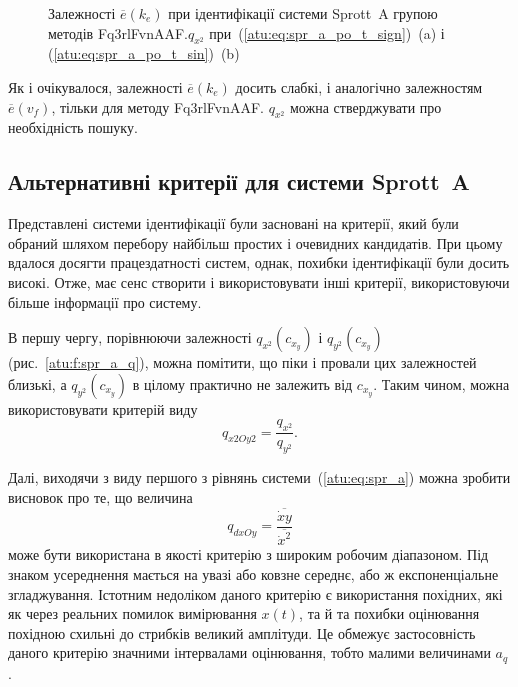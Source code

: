 \begin{figure}[htb!]
  \caption{Залежності $\overline{e} (k_e)$ при ідентифікації системи Sprott~A групою методів Fq3rlFvnAAF.$q_{x^2}$ при~(\ref{atu:eq:spr_a_po_t_sign})~(a) і (\ref{atu:eq:spr_a_po_t_sin})~(b)}
  \label{atu:f:spr_a_k_e_Fq3rlFvnAAF_q_x2}
\end{figure}

Як і очікувалося, залежності
$\overline{e}(k_e)$ досить слабкі, і аналогічно залежностям
$\overline{e}(v_f)$, тільки для методу Fq3rlFvnAAF.
$q_{x^2}$ можна стверджувати про необхідність пошуку.


\subsection{Альтернативні критерії для системи Sprott~A} %

Представлені системи ідентифікації були засновані на критерії,
який були обраний шляхом перебору найбільш простих і очевидних
кандидатів. При цьому вдалося досягти працездатності систем,
однак, похибки ідентифікації були досить високі. Отже, має
сенс створити і використовувати інші критерії, використовуючи
більше інформації про систему.

В першу чергу, порівнюючи залежності
$q_{x^2}(c_{x_y})$ і
$q_{y^2}(c_{x_y})$ (рис.~\ref{atu:f:spr_a_q}), можна помітити, що піки і провали
цих залежностей близькі, а
$q_{y^2} (c_{x_y})$ в цілому практично не залежить від
$c_{x_y}$. Таким чином, можна використовувати критерій виду
%
\[
  q_{x2Oy2} = \frac{q_{x^2}}{q_{y^2}}.
\]

Далі, виходячи з виду першого з рівнянь системи~(\ref{atu:eq:spr_a})
можна зробити висновок про те, що величина
%
\begin{equation}
  q_{dxOy} =
  \frac{\overline{\dot{x}y}}{\overline{\dot{x}^2}}
  \label{atu:eq:spr_a_q_dxyOdx2}
\end{equation}
%
може бути використана в якості критерію з широким робочим
діапазоном. Під знаком усереднення мається на увазі або ковзне
середнє, або ж експоненціальне згладжування. Істотним недоліком
даного критерію є використання похідних, які як через реальних
помилок вимірювання
$x(t)$, та й та похибки оцінювання похідною схильні до стрибків
великий амплітуди. Це обмежує застосовність даного критерію
значними інтервалами оцінювання, тобто малими величинами
$a_q$.

